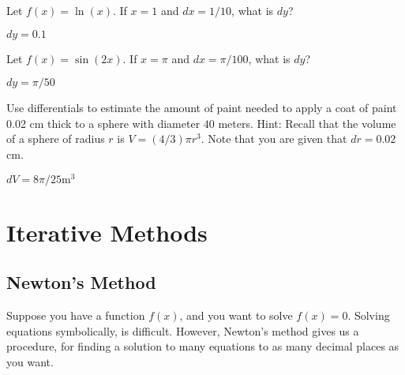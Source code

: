 \begin{exercises}
\begin{exercise} 
Let $f(x) = \ln(x)$. If $x=1$ and $dx =1/10$, what is $dy$?
\begin{answer} $dy=0.1$
\end{answer}\end{exercise}


\begin{exercise} 
Let $f(x) = \sin (2x)$. If $x=\pi$ and $dx=\pi/100$, what is $dy$?
\begin{answer} $dy=\pi/50$
\end{answer}\end{exercise}

\begin{exercise} Use differentials to estimate the amount of paint needed to
 apply a coat of paint 0.02 cm thick to a sphere with diameter $40$
 meters. Hint: Recall that the volume of a sphere of radius $r$ is $V
 =(4/3)\pi r^3$. Note that you are given that $dr=0.02$ cm.
\begin{answer} $dV=8\pi/25 \text{m}^3$
\end{answer}\end{exercise}

\end{exercises}












\section{Iterative Methods}

\subsection*{Newton's Method}

Suppose you have a function $f(x)$, and you want to solve $f(x)=0$.
Solving equations symbolically, is difficult. However, Newton's method
gives us a procedure, for finding a solution to many equations to as
many decimal places as you want.  


